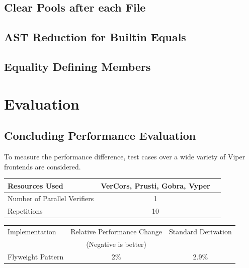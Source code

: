 \documentclass[11pt]{article}
\begin{document}
    \subsection{Clear Pools after each File}

    \subsection{AST Reduction for Builtin Equals}

    \subsection{Equality Defining Members}

    \newpage
    \section{Evaluation}

    \subsection{Concluding Performance Evaluation}

    To measure the performance difference, test cases over a wide variety of Viper
    frontends are considered.

    \begin{center}
        \begin{tabular}{ |l|c|c| } 
        \hline
        Resources Used & VerCors, Prusti, Gobra, Vyper \\ 
        \hline
        Number of Parallel Verifiers & 1 \\
        \hline
        Repetitions & 10 \\ 
        \hline
        \end{tabular}
    \end{center}

    \begin{center}
        \begin{tabular}{ |l|c|c| } 
        \hline
        Implementation & Relative Performance Change & Standard Derivation \\ 
        & (Negative is better) & \\
        \hline
        Flyweight Pattern & 2\% & 2.9\% \\ 
        \hline
        \end{tabular}
    \end{center}
\end{document}
